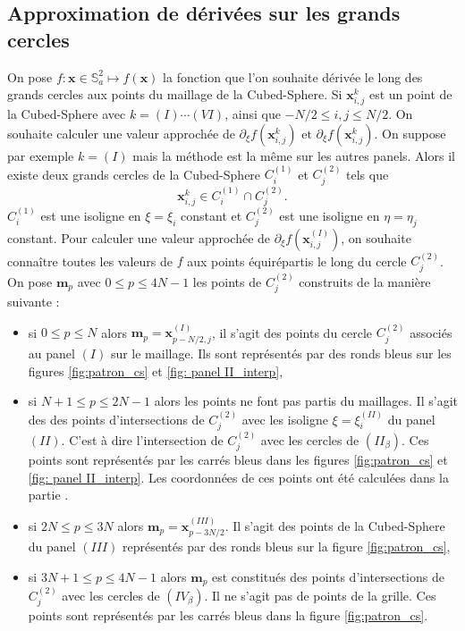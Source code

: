 \subsection{Approximation de dérivées sur les grands cercles}

On pose $f : \mathbf{x}\in \mathbb{S}_a^2 \mapsto f(\mathbf{x})$ la fonction que l'on souhaite dérivée le long des grands cercles aux points du maillage de la Cubed-Sphere.
Si $\mathbf{x}_{i,j}^k$ est un point de la Cubed-Sphere avec $k = (I) \cdots (VI)$, ainsi que $-N/2 \leq i,j \leq N/2$. On souhaite calculer une valeur approchée de 
$
\partial_{\xi} f (\mathbf{x}_{i,j}^k) \text{ et } \partial_{\xi} f (\mathbf{x}_{i,j}^k)
$.
On suppose par exemple $k = (I)$ mais la méthode est la même sur les autres panels. Alors il existe deux grands cercles de la Cubed-Sphere $C_i^{(1)}$ et $C_j^{(2)}$ tels que 
\begin{equation}
\mathbf{x}_{i,j}^k \in C_i^{(1)} \cap C^{(2)}_j.
\end{equation}
$C^{(1)}_i$ est une isoligne en $\xi = \xi_i$ constant et $C^{(2)}_j$ est une isoligne en $\eta = \eta_j$ constant.
Pour calculer une valeur approchée de $\partial_{\xi} f (\mathbf{x}_{i,j}^{(I)})$, on souhaite connaître toutes les valeurs de $f$ aux points équirépartis le long du cercle $C^{(2)}_j$. On pose $\mathbf{m}_p$ avec $0 \leq p \leq 4N-1$ les points de $C^{(2)}_j$ construits de la manière suivante :
\begin{itemize}
\item si $0 \leq p \leq N$ alors $\mathbf{m}_p = \mathbf{x}^{(I)}_{p-N/2,j}$, il s'agit des points du cercle $C^{(2)}_j$ associés au panel $(I)$ sur le maillage. Ils sont représentés par des ronds bleus sur les figures \ref{fig:patron_cs} et \ref{fig: panel II_interp},
\item si $N+1 \leq p \leq 2N-1$ alors les points ne font pas partis du maillages. Il s'agit des des points d'intersections de $C^{(2)}_j$ avec les isoligne $\xi = \xi_i^{(II)}$ du panel $(II)$. C'est à dire l'intersection de $C^{(2)}_j$ avec les cercles de $(II_{\beta})$. Ces points sont représentés par les carrés bleus dans les figures \ref{fig:patron_cs} et \ref{fig: panel II_interp}. Les coordonnées de ces points ont été calculées dans la partie \REF.
\item si $2N \leq p \leq 3N$ alors $\mathbf{m}_p = \mathbf{x}^{(III)}_{p-3N/2}$. Il s'agit des points de la Cubed-Sphere du panel $(III)$ représentés par des ronds bleus sur la figure \ref{fig:patron_cs},
\item si $3N+1 \leq p \leq 4N-1$ alors $\mathbf{m}_p$ est constitués des points d'intersections de $C^{(2)}_j$ avec les cercles de $(IV_{\beta})$. Il ne s'agit pas de points de la grille. Ces points sont représentés par les carrés bleus dans la figure \ref{fig:patron_cs}.
\end{itemize}


